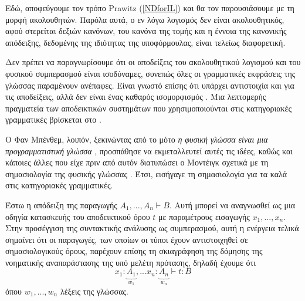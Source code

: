 \documentclass [a4paper,11pt] {book}
\theoremstyle{definition}
\theoremstyle{definition}
\newenvironment{note}[1][Σημείωση]{\begin{trivlist}
\item[\hskip \labelsep {\bfseries #1}]}{\end{trivlist}}
\begin{document}
Εδώ, αποφεύγουμε τον τρόπο Prawitz (\ref{NDforIL}) και θα τον παρουσιάσουμε με τη μορφή ακολουθητών. Παρόλα αυτά, ο εν λόγω λογισμός δεν είναι ακολουθητικός, αφού στερείται δεξιών κανόνων, του κανόνα της τομής και η έννοια της κανονικής απόδειξης, δεδομένης της ιδιότητας της υποφόρμουλας, είναι τελείως διαφορετική.
\begin{note}
Δεν πρέπει να παραγνωρίσουμε ότι οι αποδείξεις του ακολουθητικού λογισμού και του φυσικού συμπερασμού είναι ισοδύναμες, συνεπώς όλες οι γραμματικές εκφράσεις της γλώσσας παραμένουν ανέπαφες. Είναι γνωστό επίσης ότι υπάρχει αντιστοιχία και για τις αποδείξεις, αλλά δεν είναι ένας καθαρός ισομορφισμός \citep{Girard:1989:PT:64805}. 
Μια λεπτομερής πραγματεία των αποδεικτικών συστημάτων που χρησιμοποιούνται στις κατηγοριακές γραμματικές βρίσκεται στο \citep{RETORE-2005-70313}.
\end{note}
Ο Φαν Μπένθεμ, λοιπόν, ξεκινώντας από το μότο \textit{η φυσική γλώσσα είναι μια προγραμματιστική γλώσσα} \citep{Benthem1991-BENLIA}, προσπάθησε να εκμεταλλευτεί αυτές τις ιδέες, καθώς και κάποιες άλλες που είχε πριν από αυτόν διατυπώσει ο Μοντέιγκ σχετικά με τη σημασιολογία της φυσικής γλώσσας \citep{montague73:ptq}. Έτσι, εισήγαγε τη σημασιολογία για τα καλά στις κατηγοριακές γραμματικές.


Έστω η απόδειξη της παραγωγής $A_{1},...,A_{n}\vdash B$. Αυτή μπορεί να αναγνωσθεί ως μια οδηγία κατασκευής του αποδεικτικού όρου $t$ με παραμέτρους εισαγωγής $x_{1},...,x_{n}$. Στην προσέγγιση της συντακτικής ανάλυσης ως συμπερασμού, αυτή η ενέργεια τελικά σημαίνει ότι οι παραγωγές, των οποίων οι τύποι έχουν αντιστοιχηθεί σε σημασιολογικούς όρους, παρέχουν επίσης τη σκιαγράφηση της δόμησης της νοηματικής αναπαράστασης της υπό μελέτη πρότασης, δηλαδή έχουμε ότι
\begin{equation*}
x_{1}: \underbrace{A_{1}}_{w_{1}}, . . . x_{n} : \underbrace{A_{n}}_{w_{n}} \vdash t : B
\end{equation*}
όπου $w_1 , ...,w_n$ λέξεις της γλώσσας.
\end{document}
